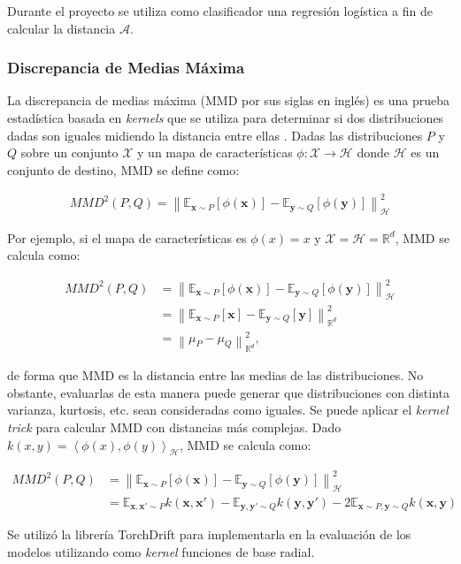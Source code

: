 Durante el proyecto se utiliza como clasificador una regresión logística a fin de calcular la distancia $\mathcal{A}$.

\subsubsection{Discrepancia de Medias Máxima}

La discrepancia de medias máxima (MMD por sus siglas en inglés) es una prueba estadística basada en {\it kernels} que
se utiliza para determinar si dos distribuciones dadas son iguales midiendo la distancia entre ellas \parencite{gretton2012kernel}. Dadas las distribuciones $P$ y $Q$ sobre un conjunto $\mathcal{X}$ y un mapa de
características $\phi : \mathcal{X} \rightarrow \mathcal{H}$ donde $\mathcal{H}$ es un conjunto de destino, MMD se
define como:

\begin{align}
    MMD^2(P, Q) = \left\lVert \mathbb{E}_{\mathbf{x} \sim P}[\phi(\mathbf{x})] - \mathbb{E}_{\mathbf{y} \sim Q}[\phi(\mathbf{y})]\right\rVert_{\mathcal{H}}^2
    \label{eq:mmd}
\end{align}

\noindent
Por ejemplo, si el mapa de características es $\phi(x)=x$ y $\mathcal{X}=\mathcal{H}=\mathbb{R}^d$, MMD se calcula
como:

\begin{align}
    MMD^2(P, Q) & = \left\lVert \mathbb{E}_{\mathbf{x} \sim P}[\phi(\mathbf{x})] - \mathbb{E}_{\mathbf{y} \sim Q}[\phi(\mathbf{y})] \right\rVert_{\mathcal{H}}^2 \nonumber \\
                & = \left\lVert \mathbb{E}_{\mathbf{x} \sim P}[\mathbf{x}] - \mathbb{E}_{\mathbf{y} \sim Q}[\mathbf{y}] \right\rVert_{\mathbb{R}^d}^2            \nonumber \\
                & = \left\lVert \mu_{P} - \mu_{Q} \right\rVert_{\mathbb{R}^d}^2,
    \label{eq:mmd-identidad}
\end{align}

\noindent
de forma que MMD es la distancia entre las medias de las distribuciones. No obstante, evaluarlas de esta manera puede
generar que distribuciones con distinta varianza, kurtosis, etc. sean consideradas como iguales. Se puede aplicar el
    {\it kernel trick} para calcular MMD con distancias más complejas. Dado $k(x, y) = \left\langle \phi(x), \phi(y)
    \right\rangle_{\mathcal{H}} $, MMD se calcula como:

\begin{align}
    MMD^2(P, Q) & = \left\lVert \mathbb{E}_{\mathbf{x} \sim P}[\phi(\mathbf{x})] - \mathbb{E}_{\mathbf{y} \sim Q}[\phi(\mathbf{y})] \right\rVert_{\mathcal{H}}^2 \nonumber                                                                          \\
                & = \mathbb{E}_{\mathbf{x}, \mathbf{x'} \sim P} k(\mathbf{x}, \mathbf{x'}) - \mathbb{E}_{\mathbf{y}, \mathbf{y'} \sim Q} k(\mathbf{y}, \mathbf{y'}) - 2 \mathbb{E}_{\mathbf{x} \sim P, \mathbf{y} \sim Q} k(\mathbf{x}, \mathbf{y})
    \label{eq:mmd-kernel}
\end{align}

\noindent
Se utilizó la librería TorchDrift \parencite{torchdrift} para implementarla en la evaluación de los modelos utilizando como {\it kernel} funciones de base
radial.